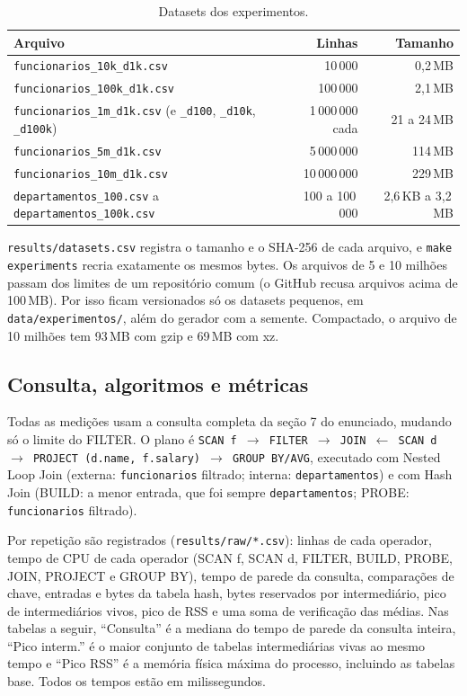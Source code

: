 \documentclass[11pt,a4paper]{article}
\begin{document}
\begin{table}[H]
\centering
\small
\begin{tabular}{@{}lrr@{}}
\toprule
Arquivo & Linhas & Tamanho \\
\midrule
\texttt{funcionarios\_10k\_d1k.csv} & 10\,000 & 0,2\,MB \\
\texttt{funcionarios\_100k\_d1k.csv} & 100\,000 & 2,1\,MB \\
\texttt{funcionarios\_1m\_d1k.csv} (e \texttt{\_d100}, \texttt{\_d10k}, \texttt{\_d100k}) & 1\,000\,000 cada & 21 a 24\,MB \\
\texttt{funcionarios\_5m\_d1k.csv} & 5\,000\,000 & 114\,MB \\
\texttt{funcionarios\_10m\_d1k.csv} & 10\,000\,000 & 229\,MB \\
\texttt{departamentos\_100.csv} a \texttt{departamentos\_100k.csv} & 100 a 100\,000 & 2,6\,KB a 3,2\,MB \\
\bottomrule
\end{tabular}
\caption{Datasets dos experimentos.}
\label{tab:datasets}
\end{table}

\texttt{results/datasets.csv} registra o tamanho e o SHA-256 de cada arquivo, e \texttt{make experiments} recria exatamente os mesmos bytes. Os arquivos de 5 e 10 milhões passam dos limites de um repositório comum (o GitHub recusa arquivos acima de 100\,MB). Por isso ficam versionados só os datasets pequenos, em \texttt{data/experimentos/}, além do gerador com a semente. Compactado, o arquivo de 10 milhões tem 93\,MB com gzip e 69\,MB com xz.

\subsection{Consulta, algoritmos e métricas}
Todas as medições usam a consulta completa da seção 7 do enunciado, mudando só o limite do FILTER. O plano é \texttt{SCAN f $\rightarrow$ FILTER $\rightarrow$ JOIN $\leftarrow$ SCAN d $\rightarrow$ PROJECT (d.name, f.salary) $\rightarrow$ GROUP BY/AVG}, executado com Nested Loop Join (externa: \texttt{funcionarios} filtrado; interna: \texttt{departamentos}) e com Hash Join (BUILD: a menor entrada, que foi sempre \texttt{departamentos}; PROBE: \texttt{funcionarios} filtrado).

Por repetição são registrados (\texttt{results/raw/*.csv}): linhas de cada operador, tempo de CPU de cada operador (SCAN f, SCAN d, FILTER, BUILD, PROBE, JOIN, PROJECT e GROUP BY), tempo de parede da consulta, comparações de chave, entradas e bytes da tabela hash, bytes reservados por intermediário, pico de intermediários vivos, pico de RSS e uma soma de verificação das médias. Nas tabelas a seguir, ``Consulta'' é a mediana do tempo de parede da consulta inteira, ``Pico interm.'' é o maior conjunto de tabelas intermediárias vivas ao mesmo tempo e ``Pico RSS'' é a memória física máxima do processo, incluindo as tabelas base. Todos os tempos estão em milissegundos.
\end{document}

